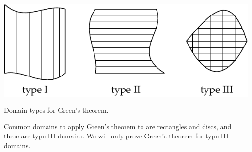 \begin{myfigureht}
\includegraphics{figures/greenstypes}
\caption{Domain types for Green's theorem.\label{fig:greenstypes}}
\end{myfigureht}

Common domains to apply Green's theorem to are rectangles and discs, and
these are type III domains.
We will only prove Green's theorem for type III domains.

